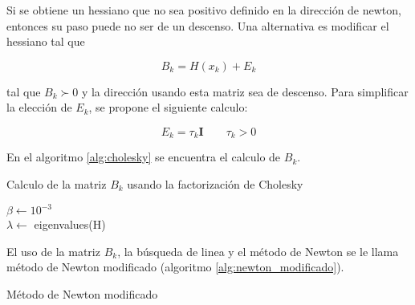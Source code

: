 Si se obtiene un hessiano que no sea positivo definido en la dirección de newton, entonces su paso puede no ser de un descenso. Una alternativa es modificar el hessiano tal que

\begin{equation*}
    B_k = H(x_k) + E_k
\end{equation*}

tal que $B_k \succ 0$ y la dirección usando esta matriz sea de descenso. Para simplificar la elección de $E_k$, se propone el siguiente calculo:

\begin{equation*}
    E_k = \tau_k \mathbf{I} \qquad \tau_k > 0
\end{equation*}

En el algoritmo \ref{alg:cholesky} se encuentra el calculo de $B_k$.

\begin{algorithm}
    \caption{Calculo de la matriz $B_k$ usando la factorización de Cholesky}
    \label{alg:cholesky}
    $\beta \gets 10^{-3}$\\
    $\lambda \gets$ eigenvalues(H)\\
\end{algorithm}

El uso de la matriz $B_k$, la búsqueda de linea y el método de Newton se le llama método de Newton modificado (algoritmo \ref{alg:newton_modificado}).

\begin{algorithm}
    \caption{Método de Newton modificado}
    \label{alg:newton_modificado}
\end{algorithm}
